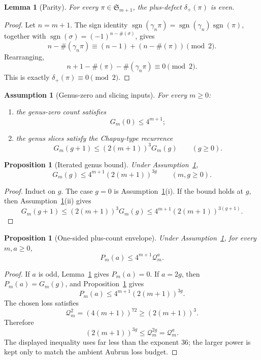\documentclass[11pt]{article}
\numberwithin{equation}{section}
\newtheorem{proposition}[theorem]{Proposition}
\newtheorem{lemma}[theorem]{Lemma}
\newtheorem{assumption}[theorem]{Assumption}
\newcommand{\Sym}{\mathfrak S}
\newcommand{\cyc}{\#}
\newcommand{\gammacyc}{\gamma_n}
\newcommand{\dplus}{\delta_+}
\newcommand{\Qloss}{\mathcal Q}
\begin{document}
\begin{lemma}[Parity]\label{lem:parity}
For every \(\pi\in\Sym_{m+1}\), the plus-defect \(\dplus(\pi)\) is even.
\end{lemma}

\begin{proof}
Let \(n=m+1\).  The sign identity
\(\operatorname{sgn}(\gammacyc\pi)=\operatorname{sgn}(\gammacyc)
\operatorname{sgn}(\pi)\), together with
\(\operatorname{sgn}(\sigma)=(-1)^{n-\cyc(\sigma)}\), gives
\[
  n-\cyc(\gammacyc\pi)
  \equiv
  (n-1)+(n-\cyc(\pi))
  \pmod 2.
\]
Rearranging,
\[
  n+1-\cyc(\pi)-\cyc(\gammacyc\pi)\equiv0\pmod 2.
\]
This is exactly \(\dplus(\pi)\equiv0\pmod2\).
\end{proof}

\begin{assumption}[Genus-zero and slicing inputs]\label{ass:genus}
For every \(m\ge0\):
\begin{enumerate}[label=(\roman*),leftmargin=2.3em]
  \item the genus-zero count satisfies
  \[
    G_m(0)\le 4^{m+1};
  \]
  \item the genus slices satisfy the Chapuy-type recurrence
  \[
    G_m(g+1)\le (2(m+1))^3G_m(g)
    \qquad(g\ge0).
  \]
\end{enumerate}
\end{assumption}

\begin{proposition}[Iterated genus bound]\label{prop:genus}
Under Assumption~\ref{ass:genus},
\[
  G_m(g)\le 4^{m+1}(2(m+1))^{3g}
  \qquad(m,g\ge0).
\]
\end{proposition}

\begin{proof}
Induct on \(g\).  The case \(g=0\) is Assumption~\ref{ass:genus}(i).  If the
bound holds at \(g\), then Assumption~\ref{ass:genus}(ii) gives
\[
  G_m(g+1)\le (2(m+1))^3G_m(g)
  \le
  4^{m+1}(2(m+1))^{3(g+1)}.
\]
\end{proof}

\begin{proposition}[One-sided plus-count envelope]\label{prop:plus}
Under Assumption~\ref{ass:genus}, for every \(m,a\ge0\),
\[
  P_m(a)\le 4^{m+1}\Qloss_m^a.
\]
\end{proposition}

\begin{proof}
If \(a\) is odd, Lemma~\ref{lem:parity} gives \(P_m(a)=0\).  If
\(a=2g\), then \(P_m(a)=G_m(g)\), and Proposition~\ref{prop:genus} gives
\[
  P_m(a)\le 4^{m+1}(2(m+1))^{3g}.
\]
The chosen loss satisfies
\[
  \Qloss_m^2=(4(m+1))^{72}\ge (2(m+1))^3.
\]
Therefore
\[
  (2(m+1))^{3g}
  \le
  \Qloss_m^{2g}
  =
  \Qloss_m^a.
\]
The displayed inequality uses far less than the exponent \(36\); the larger
power is kept only to match the ambient Aubrun loss budget.
\end{proof}
\end{document}
